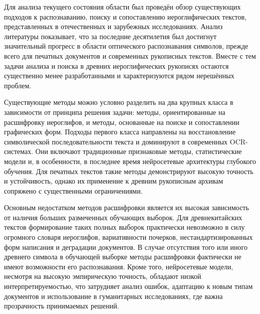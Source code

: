 
{\progress}
Для анализа текущего состояния области был проведён обзор существующих подходов к распознаванию, поиску и сопоставлению иероглифических текстов, представленных в отечественных и зарубежных исследованиях. Анализ литературы показывает, что за последние десятилетия был достигнут значительный прогресс в области оптического распознавания символов, прежде всего для печатных документов и современных рукописных текстов. Вместе с тем задачи анализа и поиска в древних иероглифических рукописях остаются существенно менее разработанными и характеризуются рядом нерешённых проблем.

Существующие методы можно условно разделить на два крупных класса в зависимости от принципа решения задачи: методы, ориентированные на расшифровку иероглифов, и методы, основанные на поиске и сопоставлении графических форм. Подходы первого класса направлены на восстановление символической последовательности текста и доминируют в современных OCR-системах. Они включают традиционные признаковые методы, статистические модели и, в особенности, в последнее время нейросетевые архитектуры глубокого обучения. Для печатных текстов такие методы демонстрируют высокую точность и устойчивость, однако их применение к древним рукописным архивам сопряжено с существенными ограничениями.

Основным недостатком методов расшифровки является их высокая зависимость от наличия больших размеченных обучающих выборок. Для древнекитайских текстов формирование таких полных выборок практически невозможно в силу огромного словаря иероглифов, вариативности почерков, нестандартизированных форм написания и деградации документов. В случае отсутствия того или иного древнего символа в обучающей выборке методы расшифровки фактически не имеют возможности его распознавания. Кроме того, нейросетевые модели, несмотря на высокую эмпирическую точность, обладают низкой интерпретируемостью, что затрудняет анализ ошибок, адаптацию к новым типам документов и использование в гуманитарных исследованиях, где важна прозрачность принимаемых решений.

